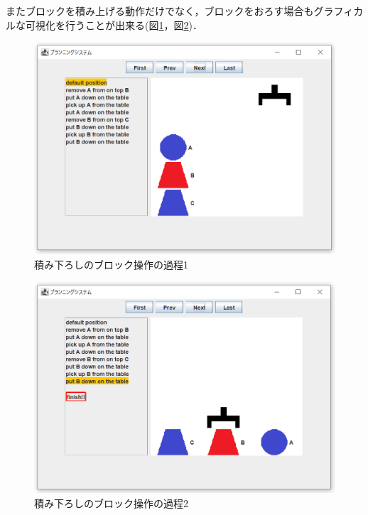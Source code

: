 \documentclass[12pt]{jarticle}
\begin{document}
\clearpage
またブロックを積み上げる動作だけでなく，ブロックをおろす場合もグラフィカルな可視化を行うことが出来る(図\ref{fig:page14}，図\ref{fig:page16})．
\begin{figure}[htbp]
  \begin{center}
    \includegraphics[scale=0.49]{images/page14.PNG}
    \caption{積み下ろしのブロック操作の過程1}
    \label{fig:page14}
  \end{center}
\end{figure}
\begin{figure}[htbp]
  \begin{center}
    \includegraphics[scale=0.49]{images/page16.PNG}
    \caption{積み下ろしのブロック操作の過程2}
    \label{fig:page16}
  \end{center}
\end{figure}
\end{document}
